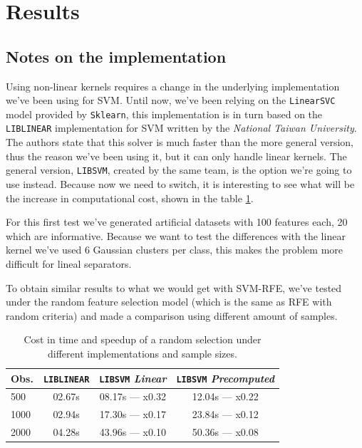 \section{Results}

\subsection*{Notes on the implementation}

Using non-linear kernels requires a change in the underlying implementation we've been using for SVM. Until now, we've been relying on the \texttt{LinearSVC} model pro\-vid\-ed by \texttt{Sklearn}, this implementation is in turn based on the \texttt{LIBLINEAR} im\-ple\-men\-ta\-tion for SVM written by the \emph{National Taiwan University}. The authors state that this solver is much faster than the more general version, thus the reason we've been using it, but it can only handle linear kernels. The general version, \texttt{LIBSVM}, created by the same team, is the option we're going to use instead. Because now we need to switch, it is interesting to see what will be the increase in computational cost, shown in the table \ref{ch5.kernels.tc1}.

For this first test we've generated artificial datasets with 100 features each, 20 which are informative. Because we want to test the differences with the linear kernel we've used 6 Gaussian clusters per class, this makes the problem more difficult for lineal separators. 

To obtain similar results to what we would get with SVM-RFE, we've tested under the random feature selection model (which is the same as RFE with random criteria) and made a comparison using different amount of samples.

\begin{table}[h]
    \centering
    \begin{tabular}{l c c c}
        \toprule
        Obs. & \texttt{LIBLINEAR} & \texttt{LIBSVM} \emph{Linear} & \texttt{LIBSVM} \emph{Precomputed} \\
        \midrule
        500 & 02.67s & 08.17s — x0.32 & 12.04s — x0.22 \\
        1000 & 02.94s & 17.30s — x0.17 & 23.84s — x0.12 \\
        2000 & 04.28s & 43.96s — x0.10 & 50.36s — x0.08 \\
        \bottomrule
        \end{tabular}
    \caption{Cost in time and speedup of a random selection under different implementations and sample sizes.}
    \label{ch5.kernels.tc1}
\end{table}

